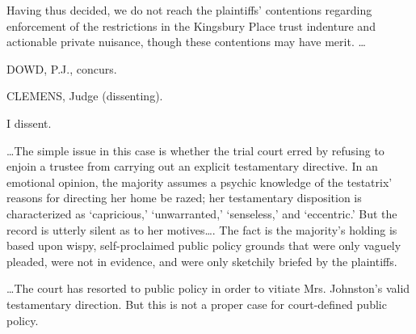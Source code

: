 Having thus decided, we do not reach the plaintiffs' contentions regarding
enforcement of the restrictions in the Kingsbury Place trust indenture and
actionable private nuisance, though these contentions may have
merit. \ldots

DOWD, P.J., concurs.

CLEMENS, Judge (dissenting).

I dissent.

\ldots The simple issue in this case is whether the trial court erred by
refusing to enjoin a trustee from carrying out an explicit testamentary
directive. In an emotional opinion, the majority assumes a psychic knowledge of
the testatrix' reasons for directing her home be razed; her testamentary
disposition is characterized as `capricious,' `unwarranted,' `senseless,' and
`eccentric.' But the record is utterly silent as to her motives\ldots. The
fact is the majority's holding is based upon wispy, self-proclaimed public
policy grounds that were only vaguely pleaded, were not in evidence, and were
only sketchily briefed by the plaintiffs.

\ldots The court has resorted to public policy in order to vitiate Mrs.
Johnston's valid testamentary direction. But this is not a proper case for
court-defined public policy.


